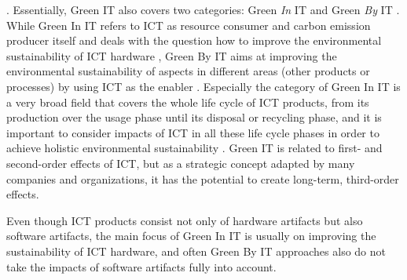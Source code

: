 \documentclass[oribibl]{llncs}
\begin{document}
. Essentially, Green IT also covers two categories: Green \textit{In} IT and Green \textit{By} IT \cite{hilty11}. While Green In IT refers to ICT as resource consumer and carbon emission producer itself and deals with the question how to improve the environmental sustainability of ICT hardware \cite{calero_green_2015}, Green By IT aims at improving the environmental sustainability of aspects in different areas (other products or processes) by using ICT as the enabler \cite{hilty11}. Especially the category of Green In IT is a very broad field that covers the whole life cycle of ICT products, from its production over the usage phase until its disposal or recycling phase, and it is important to consider impacts of ICT in all these life cycle phases in order to achieve holistic environmental sustainability \cite{hilty11}. %
Green IT is related to first- and second-order effects of ICT, but as a strategic concept adapted by many companies and organizations, it has the potential to create long-term, third-order effects. %

Even though ICT products consist not only of hardware artifacts but also software artifacts, the main focus of Green In IT is usually on improving the sustainability of ICT hardware, %
and often Green By IT approaches also do not take the impacts of software artifacts fully into account. %
\end{document}
